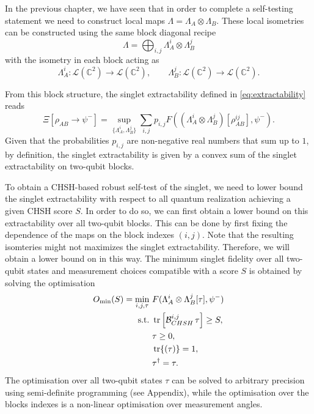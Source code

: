 In the previous chapter, we have seen that in order to complete a self-testing statement we need to construct local maps $\Lambda = \Lambda_A \otimes \Lambda_B$.
These local isometries can be constructed using the same block diagonal recipe 
\begin{equation}
		\Lambda = \bigoplus_{i,j} \Lambda_A^i \otimes \Lambda_B^j
	\label{eq:}
\end{equation}
with the isometry in each block acting as
\begin{equation}
	\Lambda_A^i: \mathcal{L}(\mathds{C}^2) \rightarrow \mathcal{L}(\mathds{C}^2), \qquad \Lambda_B^j: \mathcal{L}(\mathds{C}^2) \rightarrow \mathcal{L}(\mathds{C}^2).
	\label{eq:}
\end{equation}

From this block structure, the singlet extractability defined in \eqref{eq:extractability} reads
\begin{equation}
	\Xi [\rho_{AB} \rightarrow \psi^{-}] = \sup_{\{\Lambda_A^i,\Lambda_B^j\}} \sum_{i,j} p_{i,j} F((\Lambda_A^i \otimes \Lambda_B^j)[\rho_{AB}^{ij}],\psi^{-}).
	\label{eq:block_extractability}
\end{equation}
Given that the probabilities $p_{i,j}$ are non-negative real numbers that sum up to $1$, by definition, the singlet extractability is given by a convex sum of the singlet extractability on two-qubit blocks.

\medbreak

To obtain a CHSH-based robust self-test of the singlet, we need to lower bound the singlet extractability with respect to all quantum realization achieving a given CHSH score $S$.
In order to do so, we can first obtain a lower bound on this extractability over all two-qubit blocks.
This can be done by first fixing the dependence of the maps on the block indexes $(i,j)$.
Note that the resulting isomteries might not maximizes the singlet extractability.
Therefore, we will obtain a lower bound on  in this way.
The minimum singlet fidelity over all two-qubit states and measurement choices compatible with a score $S$ is obtained by solving the optimisation
\begin{equation}
	\begin{split}
		O_{\min}(S)=\min_{i, j, \tau} \-\ & F(\Lambda_A^i \otimes\Lambda_B^j [\tau] ,\psi^-)\\
		\text{s.t.} \-\ &\trr{\mathcal{B}_{CHSH}^{i,j}\, \tau} \geq S,\\
		& \tau \geq 0,\\
		& \tr{(\tau)} =1,\\
		& \tau^\dag = \tau.
	\end{split}
	\label{eq:sdp_extractability}
\end{equation}
The optimisation over all two-qubit states $\tau$ can be solved to arbitrary precision using semi-definite programming (see Appendix), while the optimisation over the blocks indexes is a non-linear optimisation over measurement angles.

